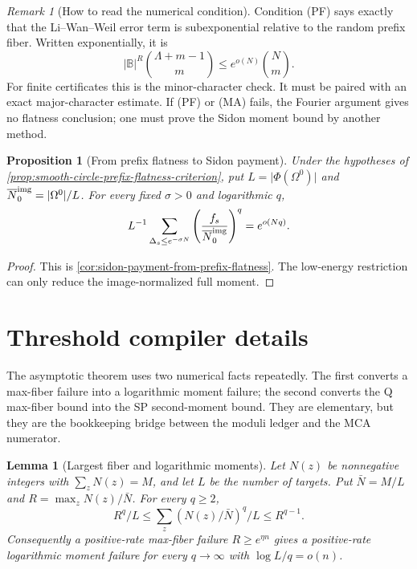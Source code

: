 \documentclass[12pt,a4paper]{amsart}
\numberwithin{equation}{section}
\newtheorem{proposition}[proposition]{Proposition}
\newtheorem{lemma}[lemma]{Lemma}
\theoremstyle{remark}
\newtheorem{remark}[remark]{Remark}
\newcommand{\B}{\mathbb B}
\newcommand{\barN}{\overline N}
\newcommand{\abs}[1]{\lvert #1\rvert}
\begin{document}
\begin{remark}[How to read the numerical condition]\label{rem:pf-numerical}
Condition \textup{(PF)} says exactly that the Li--Wan--Weil error term is subexponential relative to the random prefix fiber.  Written exponentially, it is
\[
        \abs\B^R\binom{\Lambda+m-1}{m}\le e^{o(N)}\binom Nm.
\]
For finite certificates this is the minor-character check.  It must be
paired with an exact major-character estimate.  If \textup{(PF)} or
\textup{(MA)} fails, the Fourier argument gives no flatness conclusion;
one must prove the Sidon moment bound by another method.
\end{remark}

\begin{proposition}[From prefix flatness to Sidon payment]\label{prop:equidistribution-to-sidon}
Under the hypotheses of
\cref{prop:smooth-circle-prefix-flatness-criterion}, put
\(L=\abs{\Phi(\Omega^0)}\) and
\(\barN_0^{\rm img}=\abs{\Omega^0}/L\).  For every fixed \(\sigma>0\)
and logarithmic \(q\),
\[
        L^{-1}\sum_{\Delta_s\le e^{-\sigma N}}
        \left(\frac{f_s}{\barN_0^{\rm img}}\right)^q=e^{o(Nq)}.
\]
\end{proposition}

\begin{proof}
This is \cref{cor:sidon-payment-from-prefix-flatness}.  The low-energy
restriction can only reduce the image-normalized full moment.
\end{proof}

\section{Threshold compiler details}\label{sec:threshold-details}

The asymptotic theorem uses two numerical facts repeatedly.  The first converts a max-fiber failure into a logarithmic moment failure; the second converts the Q max-fiber bound into the SP second-moment bound.  They are elementary, but they are the bookkeeping bridge between the moduli ledger and the MCA numerator.

\begin{lemma}[Largest fiber and logarithmic moments]\label{lem:largest-fiber-log-detail}
Let \(N(z)\) be nonnegative integers with \(\sum_zN(z)=M\), and let \(L\) be the number of targets.  Put \(\bar N=M/L\) and \(R=\max_z N(z)/\bar N\).  For every \(q\ge2\),
\[
        R^{q}/L\le \sum_z (N(z)/\bar N)^q/L\le R^{q-1}.
\]
Consequently a positive-rate max-fiber failure \(R\ge e^{\eta n}\) gives a positive-rate logarithmic moment failure for every \(q\to\infty\) with \(\log L/q=o(n)\).
\end{lemma}
\end{document}
